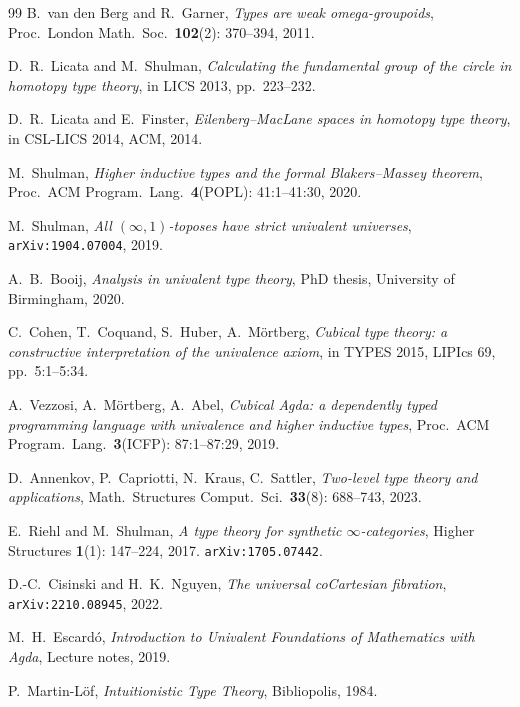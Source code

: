 \documentclass[12pt]{article}
\theoremstyle{definition}
\theoremstyle{remark}
\begin{document}
\begin{thebibliography}{99}
B.~van den Berg and R.~Garner,
\emph{Types are weak omega-groupoids},
Proc.\ London Math.\ Soc.\ \textbf{102}(2): 370--394, 2011.

D.~R.~Licata and M.~Shulman,
\emph{Calculating the fundamental group of the circle in homotopy type theory},
in LICS 2013, pp.~223--232.

D.~R.~Licata and E.~Finster,
\emph{Eilenberg--MacLane spaces in homotopy type theory},
in CSL-LICS 2014, ACM, 2014.

M.~Shulman,
\emph{Higher inductive types and the formal Blakers--Massey theorem},
Proc.\ ACM Program.\ Lang.\ \textbf{4}(POPL): 41:1--41:30, 2020.

M.~Shulman,
\emph{All $(\infty,1)$-toposes have strict univalent universes},
\texttt{arXiv:1904.07004}, 2019.

A.~B.~Booij,
\emph{Analysis in univalent type theory},
PhD thesis, University of Birmingham, 2020.

C.~Cohen, T.~Coquand, S.~Huber, A.~M\"ortberg,
\emph{Cubical type theory: a constructive interpretation of the univalence axiom},
in TYPES 2015, LIPIcs 69, pp.~5:1--5:34.

A.~Vezzosi, A.~M\"ortberg, A.~Abel,
\emph{Cubical Agda: a dependently typed programming language with univalence and higher inductive types},
Proc.\ ACM Program.\ Lang.\ \textbf{3}(ICFP): 87:1--87:29, 2019.

D.~Annenkov, P.~Capriotti, N.~Kraus, C.~Sattler,
\emph{Two-level type theory and applications},
Math.\ Structures Comput.\ Sci.\ \textbf{33}(8): 688--743, 2023.

E.~Riehl and M.~Shulman,
\emph{A type theory for synthetic $\infty$-categories},
Higher Structures \textbf{1}(1): 147--224, 2017.
\texttt{arXiv:1705.07442}.

D.-C.~Cisinski and H.~K.~Nguyen,
\emph{The universal coCartesian fibration},
\texttt{arXiv:2210.08945}, 2022.

M.~H.~Escard\'o,
\emph{Introduction to Univalent Foundations of Mathematics with Agda},
Lecture notes, 2019.


P.~Martin-L\"of,
\emph{Intuitionistic Type Theory},
Bibliopolis, 1984.


\end{thebibliography}
\end{document}
